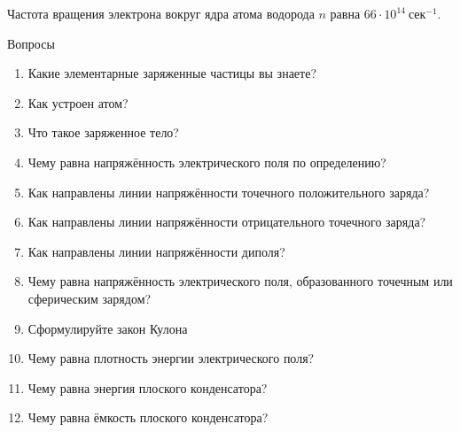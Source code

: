 \documentclass[a6paper, 11pt]{diss_4}
\renewcommand{\'}{\,'}
\begin{document}
 Частота вращения электрона вокруг ядра атома водорода $n$ равна
$66\cdot10^{14}\ сек^{-1}$.

\begin{center}
Вопросы
\end{center}
\begin{enumerate}
\item Какие элементарные заряженные частицы вы знаете?
\item Как устроен атом?
\item Что такое заряженное тело?
\item Чему равна напряжённость электрического поля по определению?
\item Как направлены линии напряжённости точечного положительного заряда?
\item Как направлены линии напряжённости отрицательного точечного заряда?
\item Как направлены линии напряжённости диполя?
\item Чему равна напряжённость электрического поля, образованного точечным или сферическим зарядом?
\item Сформулируйте закон Кулона

\item Чему равна плотность энергии электрического поля?

\item Чему равна энергия плоского конденсатора?

\item Чему равна ёмкость плоского конденсатора?
\end{enumerate}
\end{document}
